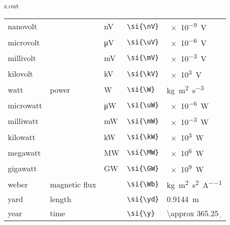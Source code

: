 \begin{VerbatimOut}{z.out}
{\begin{longtable}{@{}P{1.4in}P{1in}llP{1.8in}@{}}
    \quad nanovolt&
      \ditto&
      \si{\nV}&
      \verb+\si{\nV}+&
      \SI{e-9}{\V}\\
    \quad microvolt&
      \ditto&
      \si{\uV}&
      \verb+\si{\uV}+&
      \SI{e-6}{\V}\\
    \quad millivolt&
      \ditto&
      \si{\mV}&
      \verb+\si{\mV}+&
      \SI{e-3}{\V}\\
    \quad kilovolt&
      \ditto&
      \si{\kV}&
      \verb+\si{\kV}+&
      \SI{e3}{\V}\\
    \vsp
    watt&
      power&
      \si{\W}&
      \verb+\si{\W}+&
      \si{\kg\m\squared\per\s\cubed}\\
    \quad microwatt&
      \ditto&
      \si{\uW}&
      \verb+\si{\uW}+&
      \SI{e-6}{\W}\\
    \quad milliwatt&
      \ditto&
      \si{\mW}&
      \verb+\si{\mW}+&
      \SI{e-3}{\W}\\
    \quad kilowatt&
      \ditto&
      \si{\kW}&
      \verb+\si{\kW}+&
      \SI{e3}{\W}\\
    \quad megawatt&
      \ditto&
      \si{\MW}&
      \verb+\si{\MW}+&
      \SI{e6}{\W}\\
    \quad gigawatt&
      \ditto&
      \si{\GW}&
      \verb+\si{\GW}+&
      \SI{e9}{\W}\\
    \vsp
    weber&
      magnetic flux&
      \si{\Wb}&
      \verb+\si{\Wb}+&
      \si{\kg\m\squared\per\s\squared\per\A}\\
    \vsp
    yard&
      length&
      \si{\yd}&
      \verb+\si{\yd}+&
      \SI{.9144}{\m}\\  %
    \vsp
    year&
      time&
      \si{\y}&
      \verb+\si{\y}+&
      \SI{\approx 365.25}{\d}\\  %
  \end{longtable}
}
\end{VerbatimOut}

\MyIOS
\endinput


